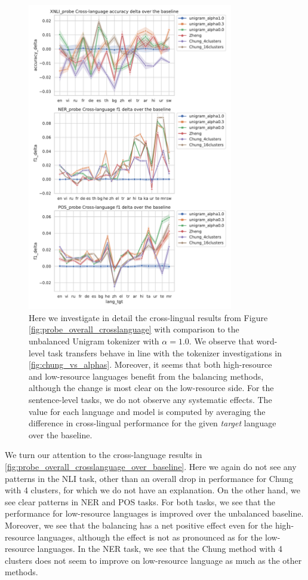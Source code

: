 \begin{figure}
    \centering
    \includegraphics[width=0.8\textwidth]{figures/probe_detailed_crosslanguage_over_baseline_lang_tgt.pdf}
    \caption{Here we investigate in detail the cross-lingual results from Figure \ref{fig:probe_overall_crosslanguage} with comparison to the unbalanced Unigram tokenizer with $\alpha=1.0$. We observe that word-level task transfers behave in line with the tokenizer investigations in \ref{fig:chung_vs_alphas}. Moreover, it seems that both high-resource and low-resource languages benefit from the balancing methods, although the change is most clear on the low-resource side. For the sentence-level tasks, we do not observe any systematic effects. The value for each language and model is computed by averaging the difference in cross-lingual performance for the given \textit{target} language over the baseline. }
    \label{fig:probe_overall_crosslanguage_over_baseline}
\end{figure}

We turn our attention to the cross-language results in \autoref{fig:probe_overall_crosslanguage_over_baseline}. Here we again do not see any patterns in the NLI task, other than an overall drop in performance for Chung with 4 clusters, for which we do not have an explanation. On the other hand, we see clear patterns in NER and POS tasks. For both tasks, we see that the performance for low-resource languages is improved over the unbalanced baseline. Moreover, we see that the balancing has a net positive effect even for the high-resource languages, although the effect is not as pronounced as for the low-resource languages. In the NER task, we see that the Chung method with 4 clusters does not seem to improve on low-resource language as much as the other methods. 

